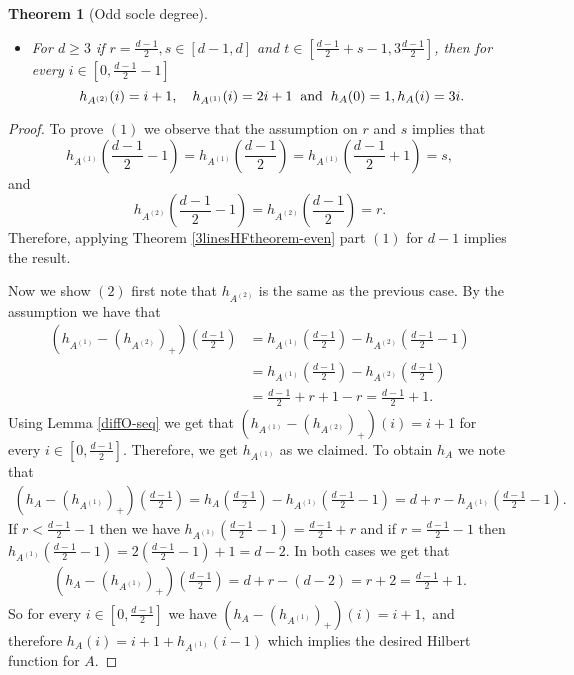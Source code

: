 \documentclass[12pt]{amsart}
\numberwithin{equation}{section}
\theoremstyle{plain} \newtheorem{theorem}{Theorem}[section]
\theoremstyle{definition} \newtheorem{definition}[theorem]{Definition}
\begin{document}
\begin{theorem}[Odd socle degree]
\begin{itemize}
\begin{equation}
              \right. 
\end{equation}
\item[$(3)$] For $d\geq 3$ if  $r=\frac{d-1}{2}, s\in [d-1,d]$ and $t\in [\frac{d-1}{2}+s-1,3\frac{d-1}{2}]$, then for every $i\in [0,\frac{d-1}{2}-1]$
  \begin{equation}\label{HFodd(3)}
 h_{A^{(2)}}(i) = i+1, \quad h_{A^{(1)}}(i) = 2i+1\hspace*{2mm}\text{and} \hspace*{2mm} h_A(0)=1,  h_A(i) =3i.
  \end{equation}
 \end{itemize}
\end{theorem}
\begin{proof}
To prove $(1)$ we observe that the assumption on $r$ and $s$ implies that 
$$ h_{A^{(1)}}(\frac{d-1}{2}-1)=h_{A^{(1)}}(\frac{d-1}{2})=h_{A^{(1)}}(\frac{d-1}{2}+1)=s,
$$
and 
$$ h_{A^{(2)}}(\frac{d-1}{2}-1)=h_{A^{(2)}}(\frac{d-1}{2})=r.
$$
Therefore, applying Theorem \ref{3linesHFtheorem-even} part $(1)$ for $d-1$ implies the result.\par 
\noindent Now we show $(2)$ first note that $h_{A^{(2)}}$ is the same as the previous case. By the assumption we have that 
\begin{align*}
(h_{A^{(1)}}-(h_{A^{(2)}})_+)(\frac{d-1}{2}) &= h_{A^{(1)}}(\frac{d-1}{2})-h_{A^{(2)}}(\frac{d-1}{2}-1)\\
&= h_{A^{(1)}}(\frac{d-1}{2})-h_{A^{(2)}}(\frac{d-1}{2})\\
&=\frac{d-1}{2}+r+1-r= \frac{d-1}{2}+1.
\end{align*}
Using Lemma \ref{diffO-seq} we get that
$(h_{A^{(1)}}-(h_{A^{(2)}})_+)(i) = i+1
$  for every $i\in[0,\frac{d-1}{2}]$.
Therefore, we get $h_{A^{(1)}}$ as we claimed.
To obtain $h_A$ we note that 
\begin{align*}
(h_{A}-(h_{A^{(1)}})_+)(\frac{d-1}{2})  = h_{A}(\frac{d-1}{2})-h_{A^{(1)}}(\frac{d-1}{2}-1)= d+r- h_{A^{(1)}}(\frac{d-1}{2}-1).
\end{align*}
If $r<\frac{d-1}{2}-1$ then we have $h_{A^{(1)}}(\frac{d-1}{2}-1)=\frac{d-1}{2}+r$ and if $r=\frac{d-1}{2}-1$ then $h_{A^{(1)}}(\frac{d-1}{2}-1)=2(\frac{d-1}{2}-1)+1=d-2.$ In both cases we get that 
\begin{align*}
(h_{A}-(h_{A^{(1)}})_+)(\frac{d-1}{2})  = d+r-(d-2) = r+2 = \frac{d-1}{2}+1.
\end{align*}
So for every $i\in[0,\frac{d-1}{2}]$ we have $(h_{A}-(h_{A^{(1)}})_+)(i) = i+1,
$ and therefore
$
h_A(i)=i+1+h_{A^{(1)}}(i-1)
$
which implies the desired Hilbert function for $A$.


\end{proof}
\end{document}
